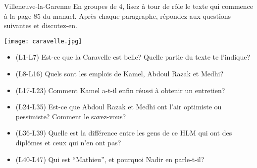\begin{frame}{Villeneuve-la-Garenne}
  \footnotesize
  En groupes de 4, lisez à tour de rôle  le texte qui commence à la page 85 du manuel.
  Après chaque paragraphe, répondez aux questions suivantes et discutez-en.
  \begin{center}
    \texttt{[image: caravelle.jpg]}
  \end{center}
  \begin{itemize}
    \item (L1-L7) Est-ce que la Caravelle est belle? Quelle partie du texte te l'indique?
    \item (L8-L16) Quels sont les emplois de Kamel, Abdoul Razak et Medhi?
    \item (L17-L23) Comment Kamel a-t-il enfin réussi à obtenir un entretien?
    \item (L24-L35) Est-ce que Abdoul Razak et Medhi ont l'air optimiste ou pessimiste? Comment le savez-vous?
    \item (L36-L39) Quelle est la différence entre les gens de ce HLM qui ont des diplômes et ceux qui n'en ont pas?
    \item (L40-L47) Qui est ``Mathieu'', et pourquoi Nadir en parle-t-il?
  \end{itemize}
\end{frame}